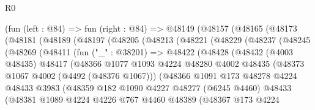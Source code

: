 \begin{lexlean}{R0}
\begin{coremodule}
        (fun (left : @84) =>
        fun (right : @84) =>
        @48149
          (@48157
            (@48165
              (@48173
                (@48181
                  (@48189
                    (@48197
                      (@48205
                        (@48213
                          (@48221
                            (@48229
                              (@48237
                                (@48245
                                  (@48269
                                    (@48411
                                      (fun ("_" : @38201) =>
                                      @48422
                                        (@48428
                                          (@48432
                                            (@4003 @48435)
                                            @48417
                                            (@48366
                                              @1077
                                              @1093
                                              @4224
                                              @48280
                                              @4002
                                              @48435
                                              (@48373 @1067 @4002 (@4492 (@48376 @1067)))
                                              (@48366
                                                @1091
                                                @173
                                                @48278
                                                @4224
                                                @48433
                                                @3983
                                                (@48359
                                                  @182
                                                  @1090
                                                  @4227
                                                  @48277
                                                  (@6245 @4460)
                                                  @48433
                                                  (@48381
                                                    @1089
                                                    @4224
                                                    @4226
                                                    @767
                                                    @4460
                                                    @48389
                                                    (@48367
                                                      @173
                                                      @4224

\end{coremodule}
\end{lexlean}
